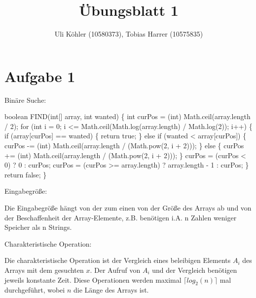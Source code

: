 \documentclass[a4paper,10pt,freqn]{article}
\title{Übungsblatt 1}
\author{Uli Köhler (10580373), Tobias Harrer (10575835)}
\begin{document}
\maketitle

\section{Aufgabe 1}
Binäre Suche:\newline

boolean FIND(int[] array, int wanted) \{\newline
        int curPos = (int) Math.ceil(array.length / 2);\newline
        for (int i = 0; i <= Math.ceil(Math.log(array.length) / Math.log(2)); i++) \{\newline
            if (array[curPos] == wanted) \{\newline
                return true;\newline
            \} else if (wanted < array[curPos]) \{\newline
                curPos -= (int) Math.ceil(array.length / (Math.pow(2, i + 2)));\newline
            \} else \{\newline
                curPos += (int) Math.ceil(array.length / (Math.pow(2, i + 2)));\newline
            \}\newline
            curPos = (curPos < 0) ? 0 : curPos;\newline
            curPos = (curPos >= array.length) ? array.length - 1 : curPos;\newline
        \}\newline
        return false;\newline
    	\}\newline
    	
\begin{bfseries}Eingabegröße:\end{bfseries}\newline
Die Eingabegröße hängt von  der zum einen von der Größe des Arrays ab und von der
Beschaffenheit der Array-Elemente, z.B. benötigen i.A. n Zahlen weniger Speicher
als n Strings.

\begin{bfseries}Charakteristische Operation:\end{bfseries}\newline
Die charakteristische Operation ist der Vergleich eines beleibigen Elements $A_i$ des Arrays mit dem gesuchten $x$.
Der Aufruf von $A_i$ und der Vergleich benötigen jeweils konstante Zeit. Diese Operationen werden maximal
$\lceil log_{2}(n)\rceil$ mal durchgeführt, wobei $n$ die Länge des Arrays ist.
\end{document}

